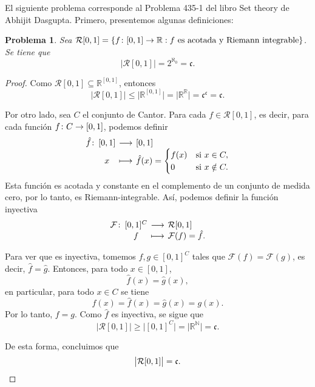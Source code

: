 \documentclass[a4,10pt]{aleph-notas}
\newtheorem*{prob}{Problema}
\begin{document}
\encabezado

\noindent
El siguiente problema corresponde al Problema 435-1 del libro Set theory de Abhijit Dasgupta. Primero, presentemos algunas definiciones:


\begin{prob}
    Sea $\mathcal{R}[0,1] = \{ f\colon [0,1] \rightarrow \mathbb{R} : f\text{ es acotada y Riemann integrable} \}$. Se tiene que 
    \[
        \big|\mathcal{R}[0,1]\big| = 2^{\aleph_0} = \mathfrak{c}.
    \]
\end{prob}

\begin{proof}
    Como $\mathcal{R}[0,1] \subseteq \mathbb{R}^{[0,1]}$, entonces
    \[
        \big|\mathcal{R}[0,1]\big| 
        \leq \big|\mathbb{R}^{[0,1]}\big| 
        = \big|\mathbb{R}^{\mathbb{R}}\big| 
        = \mathfrak{c}^{\mathfrak{c}} = \mathfrak{c}.
    \]
    
    Por otro lado, sea $C$ el conjunto de Cantor. Para cada $f \in \mathcal{R}[0,1]$, es decir, para cada función $f\colon C \rightarrow [0,1]$, podemos definir 
    \[
        \funcion{\hat{f}}{[0,1]}{[0,1]}{x}{
        \hat{f}(x) =
        \begin{cases}
            f(x) & \text{si } x \in C, \\
            0 & \text{si } x \notin C.
        \end{cases}}
    \]
    Esta función es acotada y constante en el complemento de un  conjunto de medida cero, por lo tanto, es Riemann-integrable. Así, podemos definir la función inyectiva 
    \[
        \funcion{\mathcal{F}}{[0,1]^C}{\mathcal{R}[0,1]}{f}{\mathcal{F}(f)=\hat{f}.}
    \]
    
    Para ver que es inyectiva, tomemos $f, g \in [0,1]^C$ tales que $\mathcal{F}(f)=\mathcal{F}(g)$, es decir, $\hat{f} = \hat{g}$. Entonces, para todo $x \in [0,1]$,
    \[
        \hat{f}(x) = \hat{g}(x),
    \]
    en particular, para todo $x \in C$ se tiene 
    \[
        f(x) = \hat{f}(x) = \hat{g}(x) = g(x).
    \]
    Por lo tanto, $f = g$. Como $\hat{f}$ es inyectiva, se sigue que
    \[
        \big|\mathcal{R}[0,1]\big| \geq \big|[0,1]^C\big| = \big|\mathbb{R}^{\mathbb{N}}\big| = \mathfrak{c}.
    \]
    
    De esta forma, concluimos que 
    \[
        \big|\mathcal{R}[0,1]\big| = \mathfrak{c}.\qedhere
    \]
\end{proof}

    
\end{document}
